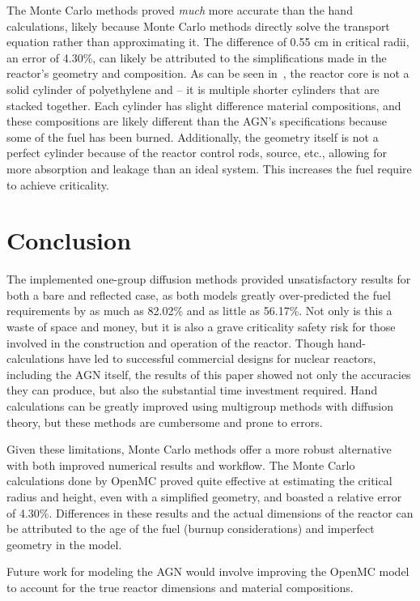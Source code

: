 \documentclass{anstrans}
\begin{document}
    The Monte Carlo methods proved \emph{much} more accurate than the hand calculations, likely because Monte Carlo methods directly solve the transport equation rather than approximating it.
    The difference of 0.55 cm in critical radii, an error of 4.30\%, can likely be attributed to the simplifications made in the reactor's geometry and composition.
    As can be seen in~\cite{TECHNICALSPECIFICATIONSUNIVERSITY2018}, the reactor core is not a solid cylinder of polyethylene and  -- it is multiple shorter cylinders that are stacked together.
    Each cylinder has slight difference material compositions, and these compositions are likely different than the AGN's specifications because some of the fuel has been burned.
    Additionally, the geometry itself is not a perfect cylinder because of the reactor control rods, source, etc., allowing for more absorption and leakage than an ideal system.
    This increases the fuel require to achieve criticality.


    \section{Conclusion}
    The implemented one-group diffusion methods provided unsatisfactory results for both a bare and reflected case, as both models greatly over-predicted the fuel requirements by as much as 82.02\% and as little as 56.17\%.
    Not only is this a waste of space and money, but it is also a grave criticality safety risk for those involved in the construction and operation of the reactor.
    Though hand-calculations have led to successful commercial designs for nuclear reactors, including the AGN itself, the results of this paper showed not only the accuracies they can produce, but also the substantial time investment required.
    Hand calculations can be greatly improved using multigroup methods with diffusion theory, but these methods are cumbersome and prone to errors.

    Given these limitations, Monte Carlo methods offer a more robust alternative with both improved numerical results and workflow.
    The Monte Carlo calculations done by OpenMC proved quite effective at estimating the critical radius and height, even with a simplified geometry, and boasted a relative error of 4.30\%.
    Differences in these results and the actual dimensions of the reactor can be attributed to the age of the fuel (burnup considerations) and imperfect geometry in the model.

    Future work for modeling the AGN would involve improving the OpenMC model to account for the true reactor dimensions and material compositions.


    
    
\end{document}
